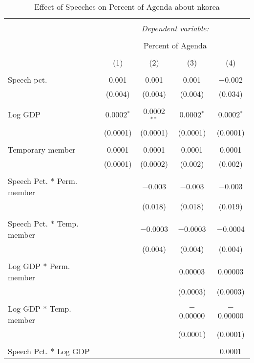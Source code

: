 
\begin{table}[!htbp] \centering 
  \caption{Effect of Speeches on Percent of Agenda about  nkorea} 
  \label{} 
\begin{tabular}{@{\extracolsep{5pt}}lcccc} 
\\[-1.8ex]\hline 
\hline \\[-1.8ex] 
 & \multicolumn{4}{c}{\textit{Dependent variable:}} \\ 
\cline{2-5} 
\\[-1.8ex] & \multicolumn{4}{c}{Percent of Agenda} \\ 
\\[-1.8ex] & (1) & (2) & (3) & (4)\\ 
\hline \\[-1.8ex] 
 Speech pct. & 0.001 & 0.001 & 0.001 & $-$0.002 \\ 
  & (0.004) & (0.004) & (0.004) & (0.034) \\ 
  & & & & \\ 
 Log GDP & 0.0002$^{*}$ & 0.0002$^{**}$ & 0.0002$^{*}$ & 0.0002$^{*}$ \\ 
  & (0.0001) & (0.0001) & (0.0001) & (0.0001) \\ 
  & & & & \\ 
 Temporary member & 0.0001 & 0.0001 & 0.0001 & 0.0001 \\ 
  & (0.0001) & (0.0002) & (0.002) & (0.002) \\ 
  & & & & \\ 
 Speech Pct. * Perm. member &  & $-$0.003 & $-$0.003 & $-$0.003 \\ 
  &  & (0.018) & (0.018) & (0.019) \\ 
  & & & & \\ 
 Speech Pct. * Temp. member &  & $-$0.0003 & $-$0.0003 & $-$0.0004 \\ 
  &  & (0.004) & (0.004) & (0.004) \\ 
  & & & & \\ 
 Log GDP * Perm. member &  &  & 0.00003 & 0.00003 \\ 
  &  &  & (0.0003) & (0.0003) \\ 
  & & & & \\ 
 Log GDP * Temp. member &  &  & $-$0.00000 & $-$0.00000 \\ 
  &  &  & (0.0001) & (0.0001) \\ 
  & & & & \\ 
 Speech Pct. * Log GDP &  &  &  & 0.0001 \\ 

\end{tabular}
\end{table}
